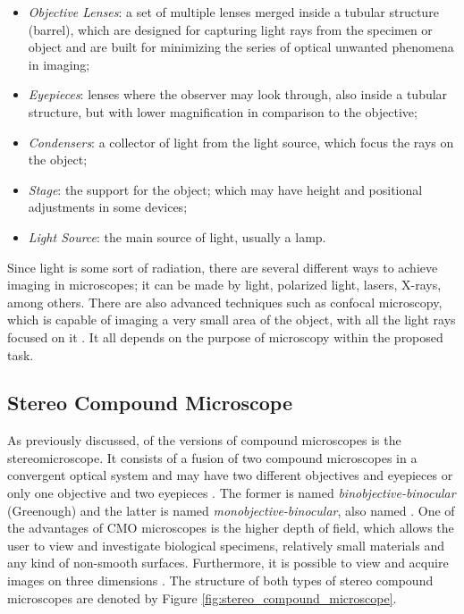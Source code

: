 \begin{itemize}
    
    \item \emph{Objective Lenses}: a set of multiple lenses merged inside a tubular structure (barrel), which are designed for capturing light rays from the specimen or object and are built for minimizing the series of optical unwanted phenomena in imaging;

    \item \emph{Eyepieces}: lenses where the observer may look through, also inside a tubular structure, but with lower magnification in comparison to the objective;

    \item \emph{Condensers}: a collector of light from the light source, which focus the rays on the object;
    
    \item \emph{Stage}: the support for the object; which may have height and positional adjustments in some devices;
    
    \item \emph{Light Source}: the main source of light, usually a lamp.
\end{itemize}

Since light is some sort of radiation, there are several different ways to achieve imaging in microscopes; it can be made by light, polarized light, lasers, X-rays, among others. There are also advanced techniques such as confocal microscopy, which is capable of imaging a very small area of the object, with all the light rays focused on it \cite{rochow1994introduction}. It all depends on the purpose of microscopy within the proposed task.

\subsection{Stereo Compound Microscope}

As previously discussed, of the versions of compound microscopes is the stereomicroscope. It consists of a fusion of two compound microscopes in a convergent optical system and may have two different objectives and eyepieces or only one objective and two eyepieces \cite{schreier2004advances}. The former is named \emph{binobjective-binocular} (Greenough) and the latter is named \emph{monobjective-binocular}, also named . One of the advantages of CMO microscopes is the higher depth of field, which allows the user to view and investigate biological specimens, relatively small materials and any kind of non-smooth surfaces. Furthermore, it is possible to view and acquire images on three dimensions \cite{rochow1994introduction}. The structure of both types of stereo compound microscopes are denoted by Figure \ref{fig:stereo_compound_microscope}.

